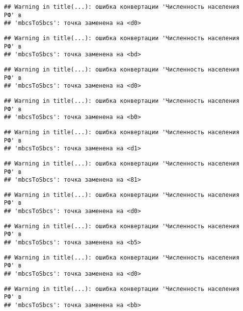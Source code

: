 \documentclass[
]{article}
\begin{document}
\begin{verbatim}
## Warning in title(...): ошибка конвертации 'Численность населения РФ' в
## 'mbcsToSbcs': точка заменена на <d0>
\end{verbatim}

\begin{verbatim}
## Warning in title(...): ошибка конвертации 'Численность населения РФ' в
## 'mbcsToSbcs': точка заменена на <bd>
\end{verbatim}

\begin{verbatim}
## Warning in title(...): ошибка конвертации 'Численность населения РФ' в
## 'mbcsToSbcs': точка заменена на <d0>
\end{verbatim}

\begin{verbatim}
## Warning in title(...): ошибка конвертации 'Численность населения РФ' в
## 'mbcsToSbcs': точка заменена на <b0>
\end{verbatim}

\begin{verbatim}
## Warning in title(...): ошибка конвертации 'Численность населения РФ' в
## 'mbcsToSbcs': точка заменена на <d1>
\end{verbatim}

\begin{verbatim}
## Warning in title(...): ошибка конвертации 'Численность населения РФ' в
## 'mbcsToSbcs': точка заменена на <81>
\end{verbatim}

\begin{verbatim}
## Warning in title(...): ошибка конвертации 'Численность населения РФ' в
## 'mbcsToSbcs': точка заменена на <d0>
\end{verbatim}

\begin{verbatim}
## Warning in title(...): ошибка конвертации 'Численность населения РФ' в
## 'mbcsToSbcs': точка заменена на <b5>
\end{verbatim}

\begin{verbatim}
## Warning in title(...): ошибка конвертации 'Численность населения РФ' в
## 'mbcsToSbcs': точка заменена на <d0>
\end{verbatim}

\begin{verbatim}
## Warning in title(...): ошибка конвертации 'Численность населения РФ' в
## 'mbcsToSbcs': точка заменена на <bb>
\end{verbatim}
\end{document}
